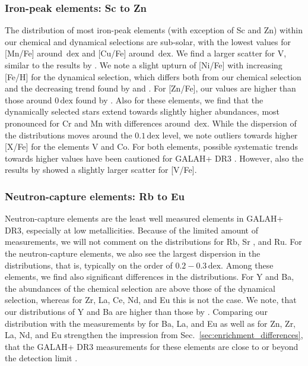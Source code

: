 \documentclass[fleqn,usenatbib]{mnras}
\newcommand{\dex}{\,\mathrm{dex}}	%
\begin{document}
\subsubsection{Iron-peak elements: Sc to Zn} \label{sec:chronochemodynamics_ironpeak}

The distribution of most iron-peak elements (with exception of Sc and Zn) within our chemical and dynamical selections are sub-solar, with the lowest values for [Mn/Fe] around $\dex$ and [Cu/Fe] around $\dex$. We find a larger scatter for V, similar to the results by \citep{Hawkins2015}. We note a slight upturn of [Ni/Fe] with increasing [Fe/H] for the dynamical selection, which differs both from our chemical selection and the decreasing trend found by \citet{Nissen2010} and \citet{Hawkins2015}. For [Zn/Fe], our values are higher than those around $0\dex$ found by \citet{Nissen2011}. Also for these elements, we find that the dynamically selected stars extend towards slightly higher abundances, most pronounced for Cr and Mn with differences around $\dex$. While the dispersion of the distributions moves around the $0.1\dex$ level, we note outliers towards higher [X/Fe] for the elements V and Co. For both elements, possible systematic trends towards higher values have been cautioned for GALAH+ DR3 \citep{Buder2021}. However, also the results by \citet{Hawkins2015} showed a slightly larger scatter for [V/Fe].

\subsubsection{Neutron-capture elements: Rb to Eu}

Neutron-capture elements are the least well measured elements in GALAH+ DR3, especially at low metallicities. Because of the limited amount of measurements, we will not comment on the distributions for Rb, Sr \citep[see however][]{Aguado2021}, and Ru.
For the neutron-capture elements, we also see the largest dispersion in the distributions, that is, typically on the order of $0.2-0.3\dex$. Among these elements, we find also significant differences in the distributions. For Y and Ba, the abundances of the chemical selection are above those of the dynamical selection, whereas for Zr, La, Ce, Nd, and Eu this is not the case. We note, that our distributions \citep[see also][]{Aguado2021} of Y and Ba are higher than those by \citet{Nissen2011}. Comparing our distribution with the measurements by \citet{Venn2004} for Ba, La, and Eu as well as \citet{Fishlock2017} for Zn, Zr, La, Nd, and Eu strengthen the impression from Sec.~\ref{sec:enrichment_differences}, that the GALAH+ DR3 measurements for these elements are close to or beyond the detection limit \citep[for Eu see also][]{Matsuno2021, Aguado2021}.
\end{document}
